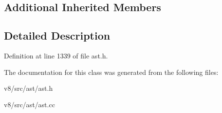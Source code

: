 \subsection*{Additional Inherited Members}


\subsection{Detailed Description}


Definition at line 1339 of file ast.\+h.



The documentation for this class was generated from the following files\+:\begin{DoxyCompactItemize}
\item 
v8/src/ast/ast.\+h\item 
v8/src/ast/ast.\+cc\end{DoxyCompactItemize}
